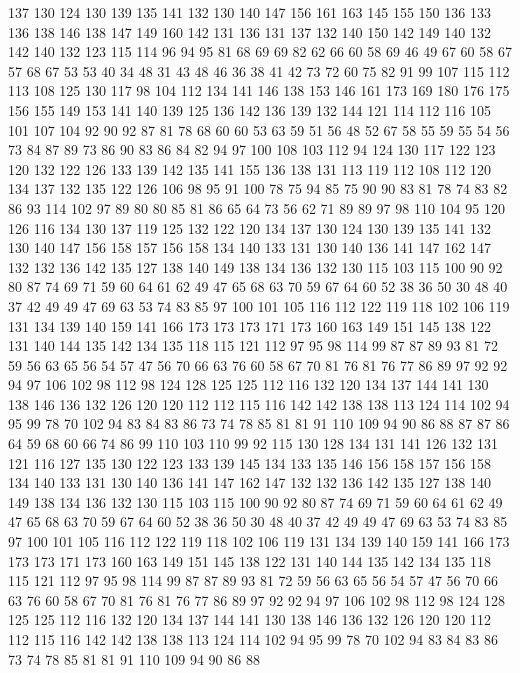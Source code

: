 137 130 124 130 139 135 141 132 130 140 147 156 161 163 145 155 150 136 133 136
138 146 138 147 149 160 142 131 136 131 137 132 140 150 142 149 140 132 142 140
132 123 115 114 96 94 95 81 68 69 69 82 62 66 60 58 69 46 49 67
60 58 67 57 68 67 53 53 40 34 48 31 43 48 46 36 38 41 42 73
72 60 75 82 91 99 107 115 112 113 108 125 130 117 98 104 112 134 141 146
138 153 146 161 173 169 180 176 175 156 155 149 153 141 140 139 125 136 142 136
139 132 144 121 114 112 116 105 101 107 104 92 90 92 87 81 78 68 60 60
53 63 59 51 56 48 52 67 58 55 59 55 54 56 73 84 87 89 73 86
90 83 86 84 82 94 97 100 108 103 112 94 124 130 117 122 123 120 132 122
126 133 139 142 135 141 155 136 138 131 113 119 112 108 112 120 134 137 132 135
122 126 106 98 95 91 100 78 75 94 85 75 90 90 83 81 78 74 83 82
86 93 114 102 97 89 80 80 85 81 86 65 64 73 56 62 71 89 89 97
98 110 104 95 120 126 116 134 130 137 119 125 132 122 120 134 137 130 124 130
139 135 141 132 130 140 147 156 158 157 156 158 134 140 133 131 130 140 136 141
147 162 147 132 132 136 142 135 127 138 140 149 138 134 136 132 130 115 103 115
100 90 92 80 87 74 69 71 59 60 64 61 62 49 47 65 68 63 70 59
67 64 60 52 38 36 50 30 48 40 37 42 49 49 47 69 63 53 74 83
85 97 100 101 105 116 112 122 119 118 102 106 119 131 134 139 140 159 141 166
173 173 173 171 173 160 163 149 151 145 138 122 131 140 144 135 142 134 135 118
115 121 112 97 95 98 114 99 87 87 89 93 81 72 59 56 63 65 56 54
57 47 56 70 66 63 76 60 58 67 70 81 76 81 76 77 86 89 97 92
92 94 97 106 102 98 112 98 124 128 125 125 112 116 132 120 134 137 144 141
130 138 146 136 132 126 120 120 112 112 115 116 142 142 138 138 113 124 114 102
94 95 99 78 70 102 94 83 84 83 86 73 74 78 85 81 81 91 110 109
94 90 86 88 87 87 86 64 59 68 60 66 74 86 99 110 103 110 99 92
115 130 128 134 131 141 126 132 131 121 116 127 135 130 122 123 133 139 145 134
133 135 146 156 158 157 156 158 134 140 133 131 130 140 136 141 147 162 147 132
132 136 142 135 127 138 140 149 138 134 136 132 130 115 103 115 100 90 92 80
87 74 69 71 59 60 64 61 62 49 47 65 68 63 70 59 67 64 60 52
38 36 50 30 48 40 37 42 49 49 47 69 63 53 74 83 85 97 100 101
105 116 112 122 119 118 102 106 119 131 134 139 140 159 141 166 173 173 173 171
173 160 163 149 151 145 138 122 131 140 144 135 142 134 135 118 115 121 112 97
95 98 114 99 87 87 89 93 81 72 59 56 63 65 56 54 57 47 56 70
66 63 76 60 58 67 70 81 76 81 76 77 86 89 97 92 92 94 97 106
102 98 112 98 124 128 125 125 112 116 132 120 134 137 144 141 130 138 146 136
132 126 120 120 112 112 115 116 142 142 138 138 113 124 114 102 94 95 99 78
70 102 94 83 84 83 86 73 74 78 85 81 81 91 110 109 94 90 86 88
